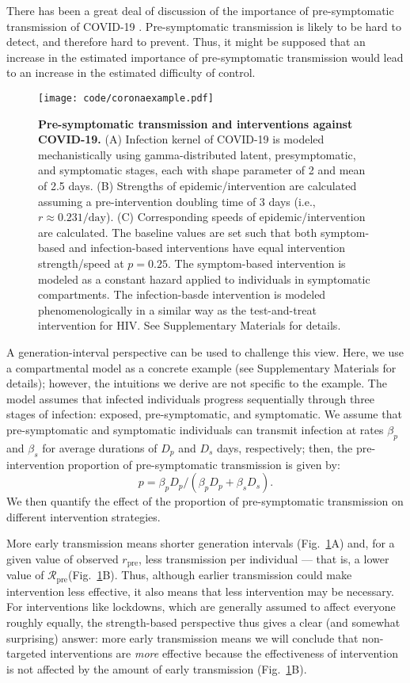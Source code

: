 \documentclass[12pt]{article}
\newcommand{\RR}{\ensuremath{{\mathcal R}}}
\newcommand{\Rx}[1]{\ensuremath{\RR_{\mathrm{#1}}}}
\newcommand{\Rpre}{\Rx{pre}}
\newcommand{\rr}{\ensuremath{{r}}}
\newcommand{\rx}[1]{\ensuremath{\rr_{\mathrm{#1}}}}
\newcommand{\rpre}{\rx{pre}}
\newcommand{\figref}[1]{Fig.~\ref{fig:#1}}
\newcommand{\figlab}[1]{\label{fig:#1}}
\begin{document}
There has been a great deal of discussion of the importance of pre-symptomatic transmission of COVID-19 \cite{ferretti2020quantifying, he2020temporal, hellewell2020feasibility}. 
Pre-symptomatic transmission is likely to be hard to detect, and therefore hard to prevent. 
Thus, it might be supposed that an increase in the estimated importance of pre-symptomatic transmission would lead to an increase in the estimated difficulty of control.

\begin{figure}[!th]
\texttt{[image: code/coronaexample.pdf]}
\caption{
\textbf{Pre-symptomatic transmission and interventions against COVID-19.}
(A) Infection kernel of COVID-19 is modeled mechanistically using gamma-distributed latent, presymptomatic, and symptomatic stages, each with shape parameter of 2 and mean of 2.5 days.
(B) Strengths of epidemic/intervention are calculated assuming a pre-intervention doubling time of 3 days (i.e., $r \approx 0.231/\mathrm{day}$).
(C) Corresponding speeds of epidemic/intervention are calculated.
The baseline values are set such that both symptom-based and infection-based interventions have equal intervention strength/speed at $p=0.25$.
The symptom-based intervention is modeled as a constant hazard applied to individuals in symptomatic compartments.
The infection-basde intervention is modeled phenomenologically in a similar way as the test-and-treat intervention for HIV.
See Supplementary Materials for details.
}
\figlab{covid}
\end{figure}

A generation-interval perspective \cite{park2019practical} can be used to challenge this view.
Here, we use a compartmental model as a concrete example (see Supplementary Materials for details); however, the intuitions we derive are not specific to the example.
The model assumes that infected individuals progress sequentially through three stages of infection: exposed, pre-symptomatic, and symptomatic.
We assume that pre-symptomatic and symptomatic individuals can transmit infection at rates $\beta_p$ and $\beta_s$ for average durations of $D_p$ and $D_s$ days, respectively;
then, the pre-intervention proportion of pre-symptomatic transmission is given by:
\begin{equation}
p=\beta_p D_p/(\beta_p D_p + \beta_s  D_s).
\end{equation}
We then quantify the effect of the proportion of pre-symptomatic transmission on different intervention strategies.

More early transmission means shorter generation intervals (\figref{covid}A) and, for a given value of observed \rpre, less transmission per individual --- that is, a lower value of \Rpre (\figref{covid}B).
Thus, although earlier transmission could make intervention less effective, it also means that less intervention may be necessary. 
For interventions like lockdowns, which are generally assumed to affect everyone roughly equally, the strength-based perspective thus gives a clear (and somewhat surprising) answer: more early transmission means we will conclude that non-targeted interventions are \emph{more} effective because the effectiveness of intervention is not affected by the amount of early transmission (\figref{covid}B).
\end{document}
